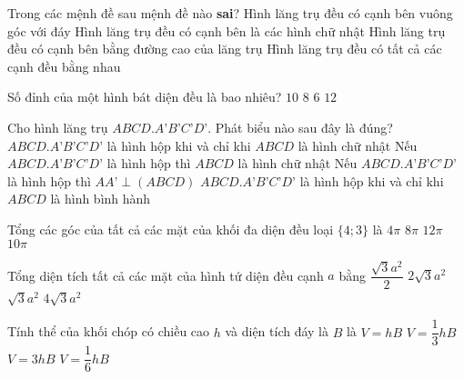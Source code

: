 \begin{ex}%
	Trong các mệnh đề sau mệnh đề nào {\bf sai}?
	\choice
	{Hình lăng trụ đều có cạnh bên vuông góc với đáy}
	{Hình lăng trụ đều có cạnh bên là các hình chữ nhật}
	{Hình lăng trụ đều có cạnh bên bằng đường cao của lăng trụ}
	{\True Hình lăng trụ đều có tất cả các cạnh đều bằng nhau}
	\loigiai{
	}
\end{ex}
\begin{ex}%
	Số đỉnh của một hình bát diện đều là bao nhiêu?
	\choice
	{$10$}
	{$8$}
	{\True $6$}
	{$12$}
	\loigiai{
	}
\end{ex}
\begin{ex}%
	Cho hình lăng trụ $ABCD.A’B’C’D’$. Phát biểu nào sau đây là đúng?
	\choice
	{$ABCD.A’B’C’D’$ là hình hộp khi và chỉ khi $ABCD$ là hình chữ nhật}
	{Nếu $ABCD.A’B’C’D’$ là hình hộp thì $ABCD$ là hình chữ nhật}
	{Nếu $ABCD.A’B’C’D’$ là hình hộp thì $AA’\perp(ABCD)$}
	{\True $ABCD.A’B’C’D’$ là hình hộp khi và chỉ khi $ABCD$ là hình bình hành}
	\loigiai{
	}
\end{ex}
\begin{ex}%
	Tổng các góc của tất cả các mặt của khối đa diện đều loại $\{4;3\}$ là
	\choice
	{$4\pi$}
	{$8\pi$}
	{\True $12\pi$}
	{$10\pi$}
\end{ex}
\begin{ex}%
	Tổng diện tích tất cả các mặt của hình tứ diện đều cạnh $a$ bằng
	\choice
	{$\dfrac{\sqrt{3}a^2}{2}$}
	{$2\sqrt{3}a^2$}
	{\True $\sqrt{3}a^2$}
	{$4\sqrt{3}a^2$}
\end{ex}
\begin{ex}%
	Tính thể của khối chóp có chiều cao $h$ và diện tích đáy là $B$ là
	\choice
	{$V=hB$}
	{\True $V=\dfrac{1}{3}hB$}
	{$V=3hB$}
	{$V=\dfrac{1}{6}hB$}
	\loigiai{
	}
\end{ex}
